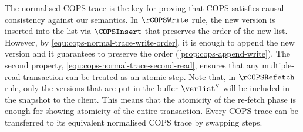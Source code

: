 The normalised COPS trace is the key for proving that COPS satisfies causal consistency against our semantics.
In \(\rCOPSWrite\) rule, the new version is inserted into 
the list via \( \COPSInsert \) that preserves the order of the new list.
However, by \cref{equ:cops-normal-trace-write-order}, it is enough to append the new version and 
it guarantees to preserve the order (\cref{prop:cops-append-write}).
The second property, \cref{equ:cops-normal-trace-second-read}, ensures that 
any multiple-read transaction can be treated as an atomic step.
Note that, in \(\rCOPSRefetch\) rule,
only the versions that are put in the buffer \( \verlist''\)
will be included in the snapshot to the client.
This means that the atomicity of the re-fetch phase is enough for showing atomicity of the entire transaction.
Every COPS trace can be transferred to its equivalent normalised COPS trace by swapping steps.


